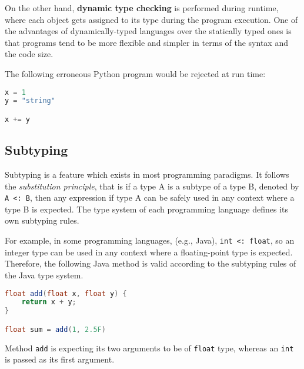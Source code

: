 On the other hand, \textbf{dynamic type checking} is performed during runtime, where each object gets assigned to its type during the program execution. One of the advantages of dynamically-typed languages over the statically typed ones is that programs tend to be more flexible and simpler in terms of the syntax and the code size.

The following erroneous Python program would be rejected at run time:
\begin{lstlisting}[language=python]
x = 1
y = "string"

x += y
\end{lstlisting}

\subsection{Subtyping}
Subtyping is a feature which exists in most programming paradigms. It follows the \textit{substitution principle}, that is if a type A is a subtype of a type B, denoted by \lstinline|A <: B|, then any expression if type A can be safely used in any context where a type B is expected. The type system of each programming language defines its own subtyping rules.

For example, in some programming languages, (e.g., Java), \lstinline|int <: float|, so an integer type can be used in any context where a floating-point type is expected. Therefore, the following Java method is valid according to the subtyping rules of the Java type system.

\begin{lstlisting}[language=java]
float add(float x, float y) {
	return x + y;
}

float sum = add(1, 2.5F)
\end{lstlisting}

Method \lstinline|add| is expecting its two arguments to be of \lstinline|float| type, whereas an \lstinline|int| is passed as its first argument.


